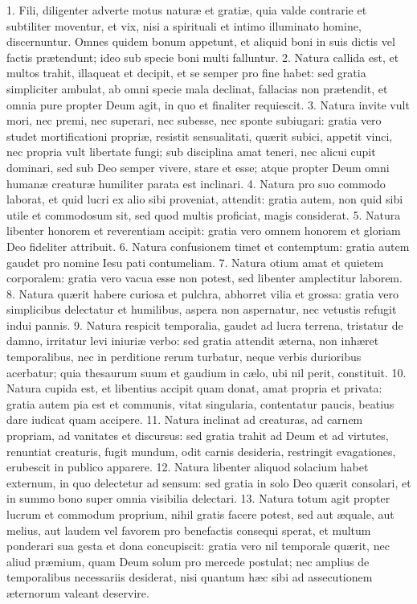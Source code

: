 1. Fili, diligenter adverte motus naturæ et gratiæ, quia valde contrarie et subtiliter moventur, et vix, nisi a spirituali et intimo illuminato homine, discernuntur. Omnes quidem bonum appetunt, et aliquid boni in suis dictis vel factis prætendunt; ideo sub specie boni multi falluntur.
2. Natura callida est, et multos trahit, illaqueat et decipit, et se semper pro fine habet: sed gratia simpliciter ambulat, ab omni specie mala declinat, fallacias non prætendit, et omnia pure propter Deum agit, in quo et finaliter requiescit.
3. Natura invite vult mori, nec premi, nec superari, nec subesse, nec sponte subiugari: gratia vero studet mortificationi propriæ, resistit sensualitati, quærit subici, appetit vinci, nec propria vult libertate fungi; sub disciplina amat teneri, nec alicui cupit dominari, sed sub Deo semper vivere, stare et esse; atque propter Deum omni humanæ creaturæ humiliter parata est inclinari.
4. Natura pro suo commodo laborat, et quid lucri ex alio sibi proveniat, attendit: gratia autem, non quid sibi utile et commodosum sit, sed quod multis proficiat, magis considerat.
5. Natura libenter honorem et reverentiam accipit: gratia vero omnem honorem et gloriam Deo fideliter attribuit.
6. Natura confusionem timet et contemptum: gratia autem gaudet pro nomine Iesu pati contumeliam.
7. Natura otium amat et quietem corporalem: gratia vero vacua esse non potest, sed libenter amplectitur laborem.
8. Natura quærit habere curiosa et pulchra, abhorret vilia et grossa: gratia vero simplicibus delectatur et humilibus, aspera non aspernatur, nec vetustis refugit indui pannis.
9. Natura respicit temporalia, gaudet ad lucra terrena, tristatur de damno, irritatur levi iniuriæ verbo: sed gratia attendit æterna, non inhæret temporalibus, nec in perditione rerum turbatur, neque verbis durioribus acerbatur; quia thesaurum suum et gaudium in cælo, ubi nil perit, constituit.
10. Natura cupida est, et libentius accipit quam donat, amat propria et privata: gratia autem pia est et communis, vitat singularia, contentatur paucis, beatius dare iudicat quam accipere.
11. Natura inclinat ad creaturas, ad carnem propriam, ad vanitates et discursus: sed gratia trahit ad Deum et ad virtutes, renuntiat creaturis, fugit mundum, odit carnis desideria, restringit evagationes, erubescit in publico apparere.
12. Natura libenter aliquod solacium habet externum, in quo delectetur ad sensum: sed gratia in solo Deo quærit consolari, et in summo bono super omnia visibilia delectari.
13. Natura totum agit propter lucrum et commodum proprium, nihil gratis facere potest, sed aut æquale, aut melius, aut laudem vel favorem pro benefactis consequi sperat, et multum ponderari sua gesta et dona concupiscit: gratia vero nil temporale quærit, nec aliud præmium, quam Deum solum pro mercede postulat; nec amplius de temporalibus necessariis desiderat, nisi quantum hæc sibi ad assecutionem æternorum valeant deservire.
